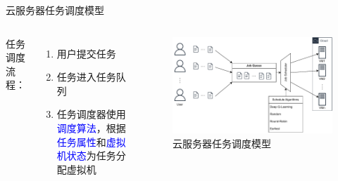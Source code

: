 \begin{frame}{云服务器任务调度模型}

    \begin{columns}

        任务调度流程：
        \begin{enumerate}
            \item 用户提交任务
            \item 任务进入任务队列
            \item 任务调度器使用\textcolor{blue}{调度算法}，根据\textcolor{blue}{任务属性}和\textcolor{blue}{虚拟机状态}为任务分配虚拟机
        \end{enumerate}


        \begin{figure}
            \centering
            \includegraphics[width=\textwidth]{pics/module.drawio.pdf}
            \caption{云服务器任务调度模型}
        \end{figure}

    \end{columns}

\end{frame}

